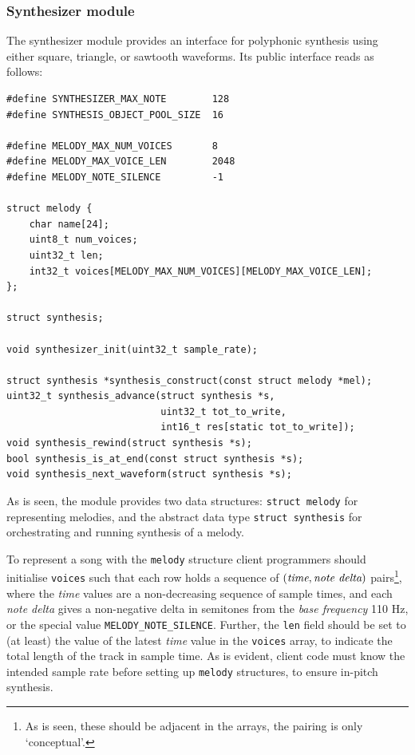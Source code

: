 \documentclass[a4paper,9pt]{article}
\newcommand{\isrc}[1]{\texttt{#1}}
\begin{document}
\clearpage

\subsubsection{Synthesizer module}
The synthesizer module provides an interface for polyphonic synthesis using
either square, triangle, or sawtooth waveforms. Its public interface reads as
follows:

\begin{lstlisting}
#define SYNTHESIZER_MAX_NOTE        128 
#define SYNTHESIS_OBJECT_POOL_SIZE  16

#define MELODY_MAX_NUM_VOICES       8
#define MELODY_MAX_VOICE_LEN        2048
#define MELODY_NOTE_SILENCE         -1

struct melody {
    char name[24];
    uint8_t num_voices;
    uint32_t len;
    int32_t voices[MELODY_MAX_NUM_VOICES][MELODY_MAX_VOICE_LEN];
};

struct synthesis;

void synthesizer_init(uint32_t sample_rate);

struct synthesis *synthesis_construct(const struct melody *mel);
uint32_t synthesis_advance(struct synthesis *s,
                           uint32_t tot_to_write,
                           int16_t res[static tot_to_write]);
void synthesis_rewind(struct synthesis *s);
bool synthesis_is_at_end(const struct synthesis *s);
void synthesis_next_waveform(struct synthesis *s);
\end{lstlisting}
As is seen, the module provides two data structures: \isrc{struct melody} for
representing melodies, and the abstract data type \isrc{struct synthesis} for
orchestrating and running synthesis of a melody.

To represent a song with the \isrc{melody} structure client programmers should
initialise \isrc{voices} such that each row holds a sequence of $(\emph{time},
\emph{note delta})$ pairs\footnote{As is seen, these should be adjacent in the
arrays, the pairing is only `conceptual'.}, where the \emph{time} values are a
non-decreasing sequence of sample times, and each \emph{note delta} gives a
non-negative delta in semitones from the \emph{base frequency} 110 Hz, or the
special value \isrc{MELODY\_NOTE\_SILENCE}. Further, the \isrc{len} field
should be set to (at least) the value of the latest \emph{time} value in the
\isrc{voices} array, to indicate the total length of the track in sample time.
As is evident, client code must know the intended sample rate before setting
up \isrc{melody} structures, to ensure in-pitch synthesis. 
\end{document}
